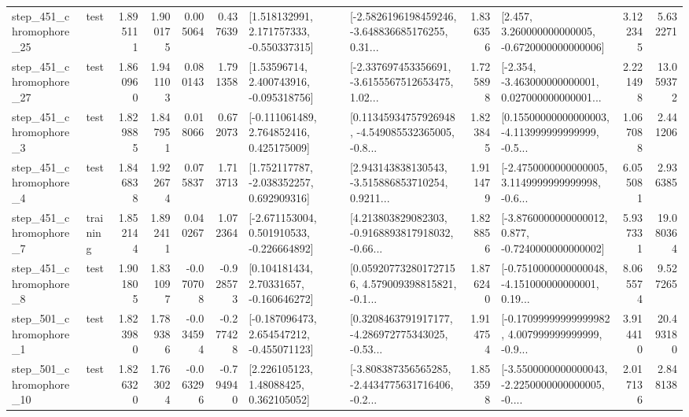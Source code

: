 \begin{tabular}{llrrrrllrlrr}
  step\_451\_chromophore\_25 &      test &      1.895111 &    1.900175 &      0.005064 &  0.437639 &    [1.518132991, 2.171757333, -0.550337315] &  [-2.5826196198459246, -3.648836685176255, 0.31... &       1.836356 &    [2.457, 3.260000000000005, -0.6720000000000006] &            3.122345 &          5.632271 \\
  step\_451\_chromophore\_27 &      test &      1.860960 &    1.941103 &      0.080143 &  1.791358 &     [1.53596714, 2.400743916, -0.095318756] &  [-2.337697453356691, -3.6155567512653475, 1.02... &       1.725898 &  [-2.354, -3.463000000000001, 0.027000000000001... &            2.221498 &         13.059372 \\
   step\_451\_chromophore\_3 &      test &      1.829885 &    1.847951 &      0.018066 &  0.672073 &    [-0.111061489, 2.764852416, 0.425175009] &  [0.11345934757926948, -4.549085532365005, -0.8... &       1.823845 &  [0.15500000000000003, -4.113999999999999, -0.5... &            1.067088 &          2.441206 \\
   step\_451\_chromophore\_4 &      test &      1.846838 &    1.922674 &      0.075837 &  1.713713 &    [1.752117787, -2.038352257, 0.692909316] &  [2.943143838130543, -3.515886853710254, 0.9211... &       1.911479 &  [-2.4750000000000005, 3.1149999999999998, -0.6... &            6.055081 &          2.936385 \\
   step\_451\_chromophore\_7 &  training &      1.852144 &    1.892411 &      0.040267 &  1.072364 &   [-2.671153004, 0.501910533, -0.226664892] &  [4.213803829082303, -0.9168893817918032, -0.66... &       1.828856 &  [-3.8760000000000012, 0.877, -0.7240000000000002] &            5.937331 &         19.080364 \\
   step\_451\_chromophore\_8 &      test &      1.901805 &    1.831097 &     -0.070708 & -0.928573 &     [0.104181434, 2.70331657, -0.160646272] &  [0.059207732801727156, 4.579009398815821, -0.1... &       1.876240 &  [-0.7510000000000048, -4.151000000000001, 0.19... &            8.065574 &          9.527265 \\
   step\_501\_chromophore\_1 &      test &      1.823980 &    1.789386 &     -0.034594 & -0.277428 &   [-0.187096473, 2.654547212, -0.455071123] &  [0.3208463791917177, -4.286972775343025, -0.53... &       1.914754 &  [-0.17099999999999982, 4.007999999999999, -0.9... &            3.914410 &         20.493180 \\
  step\_501\_chromophore\_10 &      test &      1.826320 &    1.763024 &     -0.063296 & -0.794940 &      [2.226105123, 1.48088425, 0.362105052] &  [-3.808387356565285, -2.4434775631716406, -0.2... &       1.853598 &  [-3.5500000000000043, -2.2250000000000005, -0.... &            2.017136 &          2.848138 \\

\end{tabular}
